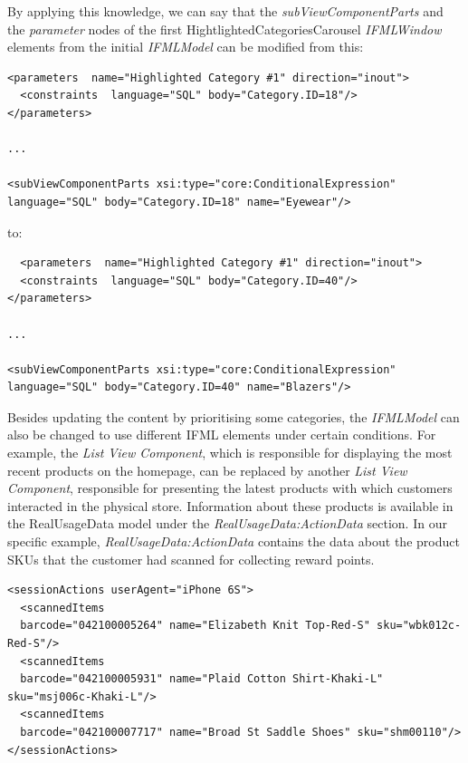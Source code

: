 By applying this knowledge, we can say that the \textit{subViewComponentParts} and the \textit{parameter} nodes of the first HightlightedCategoriesCarousel \textit{IFMLWindow} elements from the initial \textit{IFMLModel} can be modified from this:

\vspace{0.5cm}
\lstset{language=XML}
\begin{lstlisting} 
<parameters  name="Highlighted Category #1" direction="inout">
  <constraints  language="SQL" body="Category.ID=18"/>
</parameters>

...

<subViewComponentParts xsi:type="core:ConditionalExpression"  language="SQL" body="Category.ID=18" name="Eyewear"/>
\end{lstlisting}
\vspace{0.5cm}

to:

\vspace{0.5cm}
\lstset{language=XML}
\begin{lstlisting} 
  <parameters  name="Highlighted Category #1" direction="inout">
  <constraints  language="SQL" body="Category.ID=40"/>
</parameters>

...

<subViewComponentParts xsi:type="core:ConditionalExpression"  language="SQL" body="Category.ID=40" name="Blazers"/>
\end{lstlisting}
\vspace{0.5cm}
\newpage
Besides updating the content by prioritising some categories, the \textit{IFMLModel} can also be changed to use different IFML elements under certain conditions. For example, the \textit{List View Component}, which is responsible for displaying the most recent products on the homepage, can be replaced by another \textit{List View Component}, responsible for presenting the latest products with which customers interacted in the physical store. Information about these products is available in the RealUsageData model under the \textit{RealUsageData:ActionData} section. In our specific example, \textit{RealUsageData:ActionData} contains the data about the product SKUs that the customer had scanned for collecting reward points.

\vspace{0.5cm}
\lstset{language=XML}
\begin{lstlisting} 
<sessionActions userAgent="iPhone 6S">
  <scannedItems 
  barcode="042100005264" name="Elizabeth Knit Top-Red-S" sku="wbk012c-Red-S"/>
  <scannedItems 
  barcode="042100005931" name="Plaid Cotton Shirt-Khaki-L" sku="msj006c-Khaki-L"/>
  <scannedItems 
  barcode="042100007717" name="Broad St Saddle Shoes" sku="shm00110"/>
</sessionActions>
\end{lstlisting}
\vspace{0.5cm}


